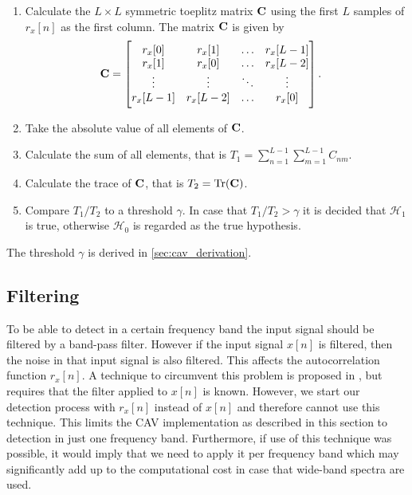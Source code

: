 \documentclass[a4paper, openany, oneside]{memoir}
\begin{document}
\begin{enumerate}[labelindent=0pt,labelwidth=\widthof{\ref{last-item3}},label=Step \arabic*:,itemindent=1em,leftmargin=!]
	\item Calculate the $L\times L$ symmetric toeplitz matrix $\boldsymbol{\mathbf{C}}$ using the first $L$ samples of $r_x[n]$ as the first column. The matrix $\boldsymbol{\mathbf{C}}$ is given by
	\begin{align}
		\boldsymbol{\mathbf{C}} &= \begin{bmatrix}
		r_x[0] & r_x[1] & \ldots & r_x[L-1] \\
		r_x[1] & r_x[0] & \ldots & r_x[L-2] \\
		\vdots & \vdots & \ddots & \vdots \\
		r_x[L-1] & r_x[L-2] & \ldots & r_x[0]
		\end{bmatrix}.
	\end{align}
	\item Take the absolute value of all elements of $\boldsymbol{\mathbf{C}}$.
	\item Calculate the sum of all elements, that is $T_1 = \sum_{n=1}^{L-1}\sum_{m=1}^{L-1} C_{nm}$.
	\item Calculate the trace of $\boldsymbol{\mathbf{C}}$, that is $T_2 = \text{Tr}(\boldsymbol{\mathbf{C}})$.
	\item Compare $T_1/T_2$ to a threshold $\gamma$. In case that $T_1/T_2 > \gamma$ it is decided that $\mathcal{H}_1$ is true, otherwise $\mathcal{H}_0$ is regarded as the true hypothesis.
    \label{last-item3}
\end{enumerate}

The threshold $\gamma$ is derived in \cref{sec:cav_derivation}.

\subsection{Filtering}
To be able to detect in a certain frequency band the input signal should be filtered by a band-pass filter. However if the input signal $x[n]$ is filtered, then the noise in that input signal is also filtered. This affects the autocorrelation function $r_x[n]$.  A technique to circumvent this problem is proposed in \cite{zheng2009spectrum}, but requires that the filter applied to $x[n]$ is known. However, we start our detection process with $r_x[n]$ instead of $x[n]$ and therefore cannot use this technique.  This limits the CAV implementation as described in this section to detection in just one frequency band. Furthermore, if use of this technique was possible, it would imply that we need to apply it per frequency band which may significantly add up to the computational cost in case that wide-band spectra are used.


\end{document}
